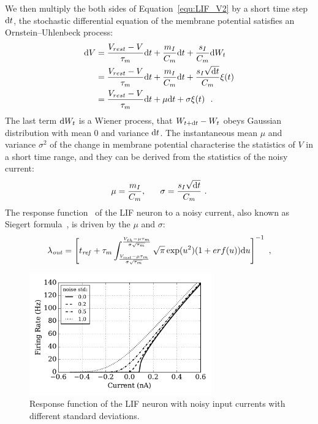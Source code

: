	We then multiply the both sides of Equation~\ref{equ:LIF_V2} by a short time step $\mathrm{d} t$, the stochastic differential equation of the membrane potential satisfies an Ornstein–Uhlenbeck process:
	\begin{equation}
	\begin{aligned}
	\mathrm{d} V&= \frac{V_{rest} - V}{\tau_m }\mathrm{d} t + \frac{m_I}{C_m} \mathrm{d} t + \frac{s_I}{C_m}  \mathrm{d} W_t \\
	&=\frac{V_{rest} - V}{\tau_m }\mathrm{d} t + \frac{m_I}{C_m} \mathrm{d} t + \frac{s_I \sqrt{\mathrm{d} t}}{C_m} \xi(t)  \\
	&=\frac{V_{rest} - V}{\tau_m }\mathrm{d} t + \mu \mathrm{d} t + \sigma \xi(t) ~~. 
	\end{aligned}
	\end{equation}	
	The last term $\mathrm{d} W_t$ is a Wiener process, that $W_{t +\mathrm{d} t} - W_{t}$ obeys Gaussian distribution with mean 0 and variance $\mathrm{d} t$.
	The instantaneous mean $\mu$ and variance $\sigma^2$ of the change in membrane potential characterise the statistics of $V$ in a short time range, and they can be derived from the statistics of the noisy current:
	\begin{equation}
	\mu =\dfrac{m_I}{C_m}, ~~~~~ \sigma = \dfrac{s_I \sqrt{\mathrm{d} t}}{C_m}~.
	\end{equation}
	The response function~\cite{rauch2003neocortical,la2008response} of the LIF neuron to a noisy current, also known as Siegert formula~\cite{siegert1951first}, is driven by the $\mu$ and $\sigma$:
	\begin{equation}
	\lambda_\mathit{out}=
	\left [ t_\mathit{ref}+\tau_m \int_{\frac{V_\mathit{rest}-\mu \tau_m }{\sigma \sqrt{\tau_m}}}^{\frac{V_{th}-\mu \tau_m }{\sigma \sqrt{\tau_m}}} \sqrt{\pi} \exp(u^{2}) (1+erf(u)) \mathrm{d} u \right ]^{-1} ~,
	\label{equ:siegert}
	\end{equation}
	

	
	\begin{figure}[bt]
		\centering
		\includegraphics[width=0.7\textwidth]{pics_iconip/1.pdf}
		\caption{Response function of the LIF neuron with noisy input currents with different standard deviations.}
		\label{Fig:physics}
	\end{figure}
	
